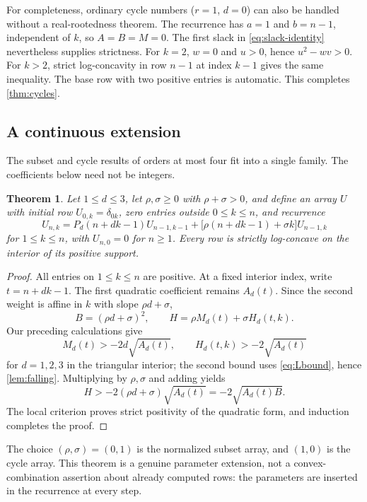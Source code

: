 \documentclass[11pt,a4paper]{article}
\numberwithin{equation}{section}
\newtheorem{theorem}{Theorem}[section]
\theoremstyle{definition}
\theoremstyle{remark}
\begin{document}
For completeness, ordinary cycle numbers ($r=1$, $d=0$) can also be
handled without a real-rootedness theorem. The recurrence has $a=1$ and
$b=n-1$, independent of $k$, so $A=B=M=0$. The first slack in
\eqref{eq:slack-identity} nevertheless supplies strictness. For $k=2$,
$w=0$ and $u>0$, hence $u^2-wv>0$. For $k>2$, strict log-concavity in
row $n-1$ at index $k-1$ gives the same inequality. The base row with two
positive entries is automatic. This completes \cref{thm:cycles}.

\subsection{A continuous extension}

The subset and cycle results of orders at most four fit into a single
family. The coefficients below need not be integers.

\begin{theorem}\label{thm:interpolation}
Let $1\le d\le3$, let $\rho,\sigma\ge0$ with $\rho+\sigma>0$, and define
an array $U$ with initial row $U_{0,k}=\delta_{0k}$, zero entries outside
$0\le k\le n$, and recurrence
\begin{equation}\label{eq:interpolating}
 U_{n,k}=P_d(n+dk-1)U_{n-1,k-1}
       +\bigl[\rho(n+dk-1)+\sigma k\bigr]U_{n-1,k}
\end{equation}
for $1\le k\le n$, with $U_{n,0}=0$ for $n\ge1$.
Every row is strictly log-concave on the interior of its positive support.
\end{theorem}
\begin{proof}
All entries on $1\le k\le n$ are positive. At a fixed interior index,
write $t=n+dk-1$. The first quadratic coefficient remains $A_d(t)$.
Since the second weight is affine in $k$ with slope $\rho d+\sigma$,
\[
 B=(\rho d+\sigma)^2,\qquad
 H=\rho M_d(t)+\sigma H_d(t,k).
\]
Our preceding calculations give
\[
 M_d(t)>-2d\sqrt{A_d(t)},\qquad
 H_d(t,k)>-2\sqrt{A_d(t)}
\]
for $d=1,2,3$ in the triangular interior; the second bound uses
\eqref{eq:Lbound}, hence \cref{lem:falling}. Multiplying by $\rho,\sigma$
and adding yields
\[
 H>-2(\rho d+\sigma)\sqrt{A_d(t)}=-2\sqrt{A_d(t)B}.
\]
The local criterion proves strict positivity of the quadratic form, and
induction completes the proof.
\end{proof}

The choice $(\rho,\sigma)=(0,1)$ is the normalized subset array, and
$(1,0)$ is the cycle array. This theorem is a genuine parameter extension,
not a convex-combination assertion about already computed rows: the
parameters are inserted in the recurrence at every step.
\end{document}
